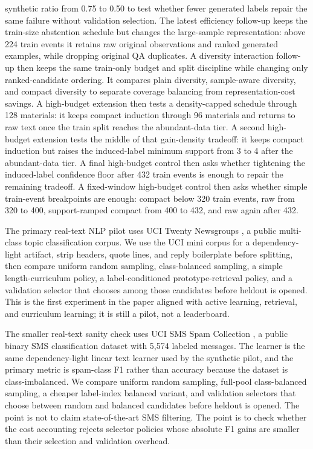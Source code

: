 \documentclass[11pt]{article}
\begin{document}
synthetic ratio from 0.75 to 0.50 to test whether fewer generated labels repair
the same failure without validation selection.
The latest efficiency follow-up keeps the train-size abstention schedule but
changes the large-sample representation: above 224 train events it retains raw
original observations and ranked generated examples, while dropping original
QA duplicates.
A diversity interaction follow-up then keeps the same train-only budget and
split discipline while changing only ranked-candidate ordering. It compares
plain diversity, sample-aware diversity, and compact diversity to separate
coverage balancing from representation-cost savings.
A high-budget extension then tests a density-capped schedule through 128
materials: it keeps compact induction through 96 materials and returns to raw
text once the train split reaches the abundant-data tier.
A second high-budget extension tests the middle of that gain-density tradeoff:
it keeps compact induction but raises the induced-label minimum support from 3
to 4 after the abundant-data tier.
A final high-budget control then asks whether tightening the induced-label
confidence floor after 432 train events is enough to repair the remaining
tradeoff.
A fixed-window high-budget control then asks whether simple train-event
breakpoints are enough: compact below 320 train events, raw from 320 to 400,
support-ramped compact from 400 to 432, and raw again after 432.

The primary real-text NLP pilot uses UCI Twenty Newsgroups
\cite{twentynewsgroupsuci,rennie20newsgroups}, a public multi-class topic
classification corpus. We use the UCI mini corpus for a dependency-light
artifact, strip headers, quote lines, and reply boilerplate before splitting,
then compare uniform random sampling, class-balanced sampling, a simple
length-curriculum policy, a label-conditioned prototype-retrieval policy, and a
validation selector that chooses among those candidates before heldout is
opened. This is the first experiment in the paper aligned with active learning,
retrieval, and curriculum learning; it is still a pilot, not a leaderboard.

The smaller real-text sanity check uses UCI SMS Spam Collection
\cite{almeida2011smsdataset}, a public binary SMS classification dataset with
5,574 labeled messages. The learner is the same dependency-light linear text
learner used by the synthetic pilot, and the primary metric is spam-class F1
rather than accuracy because the dataset is class-imbalanced. We compare
uniform random sampling, full-pool class-balanced sampling, a cheaper
label-index balanced variant, and validation selectors that choose between
random and balanced candidates before heldout is opened. The point is not to
claim state-of-the-art SMS filtering. The point is to check whether the cost
accounting rejects selector policies whose absolute F1 gains are smaller than
their selection and validation overhead.
\end{document}
